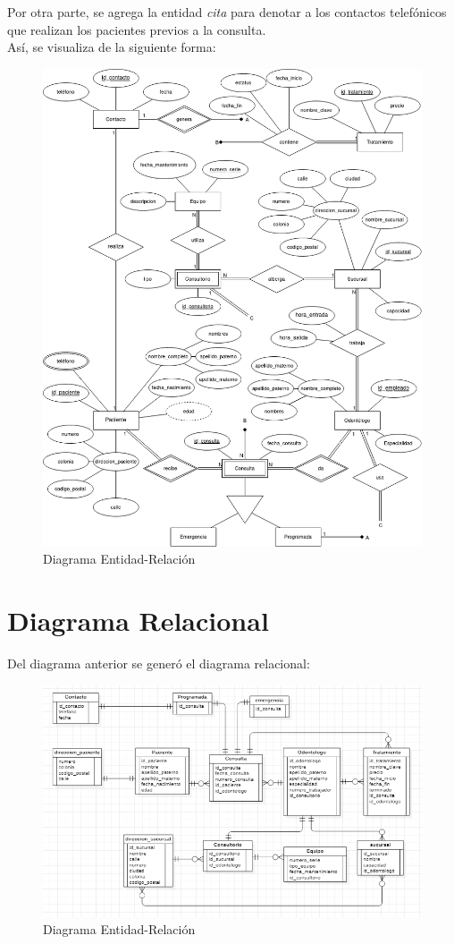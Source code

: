 \documentclass[a4paper,12pt]{article}
\begin{document}
Por otra parte, se agrega la entidad \emph{cita} para denotar a los contactos telefónicos que realizan los pacientes previos a la consulta.\\

Así, se visualiza de la siguiente forma:\\

\begin{figure}[!h]
\centering
	\includegraphics[width=.85\textwidth]{ERE}
	 \caption{Diagrama Entidad-Relación}
\end{figure}


\section{Diagrama Relacional}
Del diagrama anterior se generó el diagrama relacional:

\begin{figure}[!h]
\centering
	\includegraphics[width=.85\textwidth]{REL}
	 \caption{Diagrama Entidad-Relación}
\end{figure}
\end{document}
